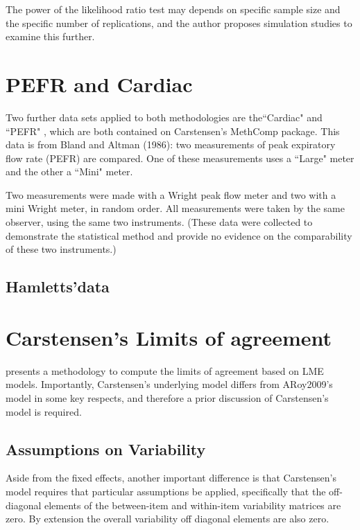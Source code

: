 \documentclass[12pt, a4paper]{report}
\theoremstyle{plain}
\theoremstyle{definition}
\theoremstyle{remark}
\begin{document}
	The power of the
	likelihood ratio test may depends on specific sample size and the
	specific number of  replications, and the author proposes
	simulation studies to examine this further.
	    
	\section{PEFR and Cardiac}
	
	
	Two further data sets applied to both methodologies are the``Cardiac" and ``PEFR" , which are both contained on Carstensen's MethComp package. This data is from Bland and Altman (1986): two measurements of peak expiratory flow rate (PEFR) are compared. One of these measurements uses a ``Large" meter and the other a ``Mini" meter.
	
	Two measurements were made with a Wright peak flow meter and two with a mini Wright meter, in random order.  All measurements were taken by the same observer, using the same two instruments. (These data were collected to demonstrate the statistical method and provide no evidence on the comparability of these two instruments.)
	
	\subsection{Hamletts'data}
	
	\section{Carstensen's Limits of agreement}
	\citet{BXC2008} presents a methodology to compute the limits of
	agreement based on LME models. Importantly, Carstensen's underlying model differs from ARoy2009's model in some key respects, and therefore a prior discussion of Carstensen's model is required.
	
	
	
	\subsection{Assumptions on Variability}
	
	Aside from the fixed effects, another important difference is that Carstensen's model requires that particular assumptions be applied, specifically that the off-diagonal elements of the between-item
	and within-item variability matrices are zero. By extension the
	overall variability off diagonal elements are also zero.
	
\end{document}
